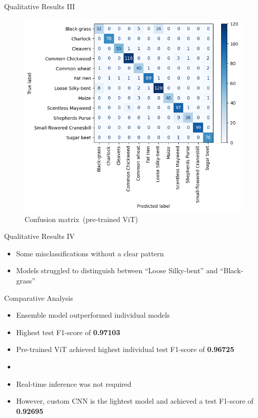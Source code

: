 \documentclass{beamer}
\begin{document}
\begin{frame}{Qualitative Results III}
    \begin{figure}
        \includegraphics[width=0.6\linewidth]{../resources/vit/confusion.png}
        \caption{Confusion matrix~(pre-trained ViT)}\label{fig:confusion-matrix-pretrained-vit}
    \end{figure}
\end{frame}

\begin{frame}{Qualitative Results IV}
    \begin{itemize}
        \item Some misclassifications without a clear pattern
        \item Models struggled to distinguish between ``Loose Silky-bent'' and ``Black-grass''
    \end{itemize}
\end{frame}

\begin{frame}{Comparative Analysis}
    \begin{itemize}
        \item Ensemble model outperformed individual models
        \item Highest test F1-score of \textbf{0.97103}
        \item Pre-trained ViT achieved highest individual test F1-score of \textbf{0.96725}
        \item[] \vspace{0.5cm}
        \item Real-time inference was not required
        \item However, custom CNN is the lightest model and achieved a test F1-score of \textbf{0.92695}
    \end{itemize}
\end{frame}
\end{document}
